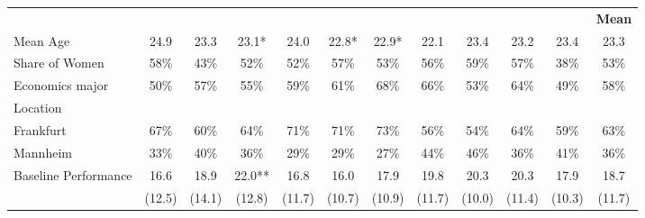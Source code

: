 \begin{landscape}
\begin{table}
\begin{center}
{\begin{tabular}[t]{|l|c|c|c|c|c|c||c|c|c|c||c|}
 	&	 	&	 	&	 	&	 	&	 	&	 	&	 	&	 	&	  	&	 	&	 	\bf Mean  \\
Mean Age  	&	 24.9	&	 23.3	&	 23.1*	&	24.0 	&	22.8* 	&	22.9* 		&	 22.1 	&	 23.4 &	 23.2	&	23.4 	&	23.3  \\
Share of Women  	&	 58\% 	&	 43\% 	&	 52\% 	&	 52\%  	&	 57\%  	&	 53\%  		&	56\% 	&	59\%  &	 57\% 	&	 38\% 	&	 53\% \\
Economics major 	&	 50\% 	&	 57\%	&	 55\%	&	 59\%	&	61\% 	&	68\% 	&	66\% 	&	53\%  	&	 64\% 	&	 49\% 	&	58\% \\
Location 	&	 	&	 	&	 	&	 	&	 	&	 	&	 	&	 	&	 	&	 	&	 		  \\
\hspace{3mm} Frankfurt  	&	 67\% 	&	 60\% 	&	 64\% 	&	 71\% 	&	 71\%	&	 73\%		&	 56\% 	&	54\%  &	 64\% 	&	 59\% 	&	 63\% \\
\hspace{3mm} Mannheim 	&	 33\%	&	 40\% 	&	 36\%	&	 29\% 	&	 29\%	&	 27\%		&	 44\% 	&	 46\% &	 36\% 	&	 41\%  & 36\% \\
Baseline Performance 	&	 16.6 	&	 18.9 	&	 22.0** 	&	16.8  	&	16.0  	&	17.9   	&	 19.8 	&	 20.3 	&	 20.3 	&	17.9	&	 18.7   \\
	&	(12.5)	&	(14.1)	&	(12.8)	&	(11.7)	&	(10.7)	&	(10.9)		&	(11.7)  	&	 (10.0)  &	(11.4)	&	(10.3)	&(11.7)\\


\end{tabular}}
\end{center}
\end{table}
\end{landscape}
